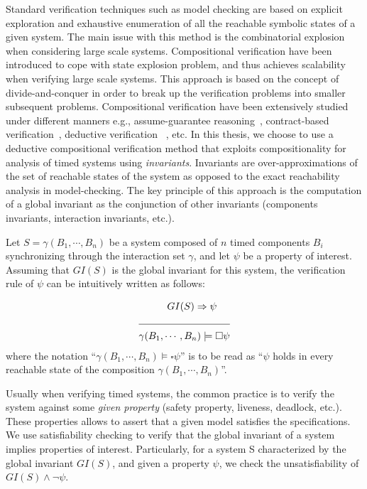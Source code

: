 Standard verification techniques such as model checking are based on explicit 
exploration and exhaustive enumeration of all the reachable symbolic states 
of a given system. The main issue with this 
method is the combinatorial explosion when considering large scale systems.
Compositional verification have been introduced to cope with state explosion
problem, and thus achieves scalability when verifying large scale systems.
This approach is based on the concept of divide-and-conquer in order to 
break up the verification
problems into smaller subsequent problems. Compositional verification have been 
extensively studied under different manners e.g., assume-guarantee 
reasoning~\cite{Lamport77,Owl76}, 
contract-based verification~\cite{contract1,contract2},  
deductive verification
~\cite{deductive}, etc.  
In this thesis, we choose to use a deductive compositional verification 
method that exploits compositionality for analysis of timed systems 
using \emph{invariants}. Invariants are over-approximations of the set 
of reachable states of the system as opposed to the exact 
reachability analysis in model-checking. The key principle of this 
approach is the computation of a global invariant as the conjunction of
other invariants (components invariants, interaction invariants, etc.).




Let $S=\gamma(B_1,\cdots,B_n)$ be a system composed of $n$ timed components $B_i$ 
synchronizing through the interaction 
set $\gamma$, and let $\psi$ be a property of interest. Assuming that 
$GI(S)$ is the global invariant for this system, 
the verification rule of $\psi$ can be intuitively
written as follows:

\begin{align*}
  &\hspace{1cm}GI(S)\Rightarrow\psi\\
    \cline{1-2}
   &\gamma(B_1,\cdots,B_n)\models\square\psi
\end{align*}
where the notation \enquote{$\gamma(B_1,\cdots,B_n)\models\square\psi$} is to 
be read as \enquote{$\psi$ holds in every reachable state of the
composition $\gamma(B_1,\cdots,B_n)$}.

Usually when verifying timed systems, the common practice is to verify the system 
against some \emph{given property} (safety property, liveness, deadlock, etc.).
These properties allows to assert that a given model satisfies the specifications.
We use satisfiability checking to verify that the global 
invariant of a system 
implies properties of interest. Particularly, for a system S characterized 
by the global invariant $GI(S)$, and 
given a property $\psi$, we check the unsatisfiability of 
$GI(S)\wedge\neg\psi$. 



